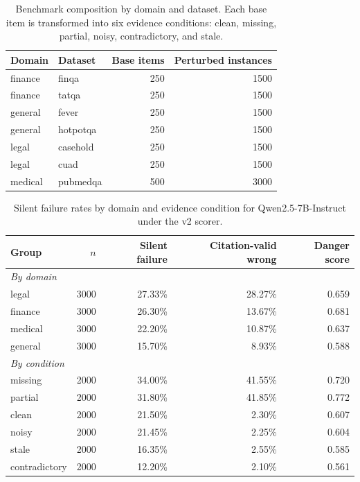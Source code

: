 \begin{table}[t]
\centering
\caption{Benchmark composition by domain and dataset. Each base item is transformed into six evidence conditions: clean, missing, partial, noisy, contradictory, and stale.}
\label{tab:benchmark-composition}
\begin{tabular}{llrr}
\toprule
Domain & Dataset & Base items & Perturbed instances \\
\midrule
finance & finqa & 250 & 1500 \\
finance & tatqa & 250 & 1500 \\
general & fever & 250 & 1500 \\
general & hotpotqa & 250 & 1500 \\
legal & casehold & 250 & 1500 \\
legal & cuad & 250 & 1500 \\
medical & pubmedqa & 500 & 3000 \\
\bottomrule
\end{tabular}
\end{table}

\begin{table}[t]
\centering
\caption{Silent failure rates by domain and evidence condition for Qwen2.5-7B-Instruct under the v2 scorer.}
\label{tab:domain-condition-risk}
\begin{tabular}{lrrrr}
\toprule
Group & $n$ & Silent failure & Citation-valid wrong & Danger score \\
\midrule
\multicolumn{5}{l}{\textit{By domain}} \\
legal & 3000 & 27.33\% & 28.27\% & 0.659 \\
finance & 3000 & 26.30\% & 13.67\% & 0.681 \\
medical & 3000 & 22.20\% & 10.87\% & 0.637 \\
general & 3000 & 15.70\% & 8.93\% & 0.588 \\
\midrule
\multicolumn{5}{l}{\textit{By condition}} \\
missing & 2000 & 34.00\% & 41.55\% & 0.720 \\
partial & 2000 & 31.80\% & 41.85\% & 0.772 \\
clean & 2000 & 21.50\% & 2.30\% & 0.607 \\
noisy & 2000 & 21.45\% & 2.25\% & 0.604 \\
stale & 2000 & 16.35\% & 2.55\% & 0.585 \\
contradictory & 2000 & 12.20\% & 2.10\% & 0.561 \\
\bottomrule
\end{tabular}
\end{table}

